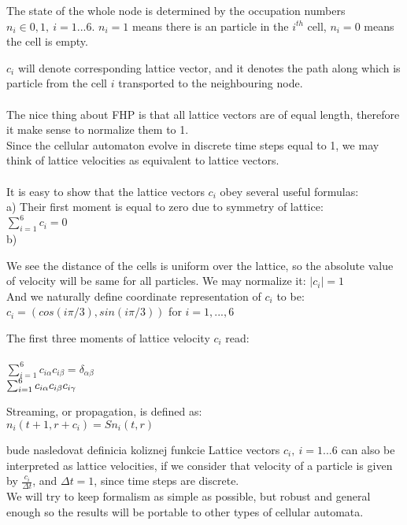 
The state of the whole node is determined by the occupation numbers $n_i\in {0,1},~i=1...6$. $n_i=1$ means there is an particle in the $i^{th}$ cell, $n_i = 0$ means the cell is empty. 

$c_i$ will denote corresponding lattice vector, and it denotes the path along which is particle from the cell $i$ transported to the neighbouring node.\\
\\
The nice thing about FHP is that all lattice vectors are of equal length, therefore it make sense to normalize them to 1.\\
Since the cellular automaton evolve in discrete time steps equal to 1,
we may think of lattice velocities as equivalent to lattice vectors.\\
\\
It is easy to show that the lattice vectors $c_i$ obey several useful formulas:\\
a) Their first moment is equal to zero due to symmetry of lattice:\\
$\sum_{i=1}^{6} c_i = 0$  \\
b) 




We see the distance of the cells is uniform over the lattice, 
so the absolute value of velocity will be same for all particles.
We may normalize it: $\mid{c_i}\mid = 1$ \\

And we naturally define coordinate representation of $c_i$ to be:\\

$ c_i = (cos(i\pi/3) , sin(i\pi/3))$ for $i = 1,...,6 $

The first three moments of lattice velocity $c_i$ read: \\ 
\\

$\sum_{i=1}^{6} c_{i\alpha}c_{i\beta} = \delta_{\alpha\beta}$ \\
$\sum_{i=1}^{6} c_{i\alpha}c_{i\beta}c_{i\gamma} \\ $

Streaming, or propagation, is defined as:\\
$ n_i(t + 1, r + c_i) = \textit{S}n_i(t, r) $

bude nasledovat definicia koliznej funkcie 
Lattice vectors $c_i,~i=1...6$ can also be interpreted as lattice velocities, if we consider that velocity of a particle is given by $\frac{c_i}{\Delta t}$, and $\Delta t = 1$, since time steps are discrete.
\\

We will try to keep formalism as simple as possible, but robust and general enough so the results will be portable to other types of cellular automata.\\